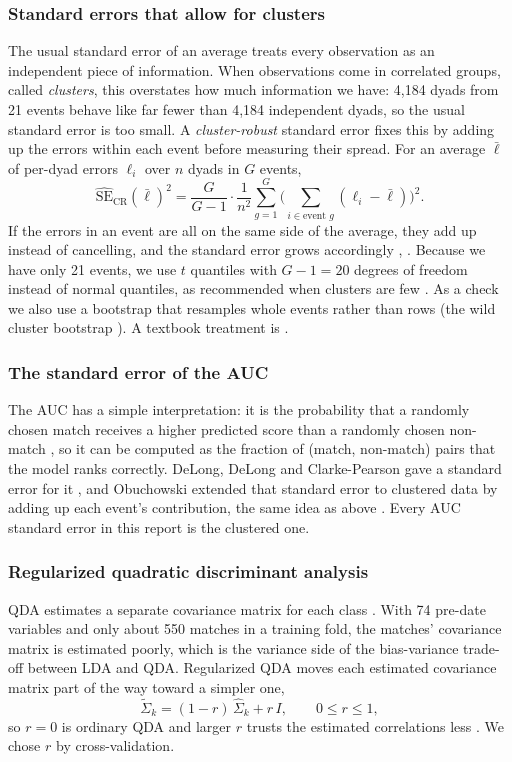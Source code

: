 \documentclass[11pt,letterpaper,reqno]{amsart}
\numberwithin{equation}{subsection}
\theoremstyle{definition}
\numberwithin{thm}{subsection}
\begin{document}
\subsubsection{Standard errors that allow for clusters}
The usual standard error of an average treats every observation as an independent piece of information. When
observations come in correlated groups, called \emph{clusters}, this overstates how much information we have: 4,184
dyads from 21 events behave like far fewer than 4,184 independent dyads, so the usual standard error is too small.
A \emph{cluster-robust} standard error fixes this by adding up the errors within each event before measuring their
spread. For an average $\bar\ell$ of per-dyad errors $\ell_i$ over $n$ dyads in $G$ events,
\[
\widehat{\mathrm{SE}}_{\mathrm{CR}}(\bar\ell)^2=\frac{G}{G-1}\cdot\frac{1}{n^2}\sum_{g=1}^{G}\Big(\sum_{i\in\text{event }g}(\ell_i-\bar\ell)\Big)^2 .
\]
If the errors in an event are all on the same side of the average, they add up instead of cancelling, and the
standard error grows accordingly \cite{Liang:1986}, \cite[Section II.C]{Cameron:2015}. Because we have only 21 events, we
use $t$ quantiles with $G-1=20$ degrees of freedom instead of normal quantiles, as recommended when clusters are few
\cite[Section VI]{Cameron:2015}. As a check we also use a bootstrap that resamples whole events rather than rows (the
wild cluster bootstrap \cite{Cameron:2008}). A textbook treatment is \cite[Section 24.5, pp.~829--845]{Cameron:2005}.

\subsubsection{The standard error of the AUC}
The AUC \cite[pp.~153--155]{James:2023} has a simple interpretation: it is the probability that a randomly chosen match
receives a higher predicted score than a randomly chosen non-match \cite[pp.~30--31]{Hanley:1982}, so it can be computed as
the fraction of (match, non-match) pairs that the model ranks correctly. DeLong, DeLong and Clarke-Pearson gave a
standard error for it \cite{DeLong:1988}, and Obuchowski extended that standard error to clustered data by adding up each
event's contribution, the same idea as above \cite{Obuchowski:1997}. Every AUC standard error in this report is the
clustered one.

\subsubsection{Regularized quadratic discriminant analysis}
QDA estimates a separate covariance matrix for each class \cite[Section 4.4.3, p.~156]{James:2023}. With 74 pre-date
variables and only about 550 matches in a training fold, the matches' covariance matrix is estimated poorly, which is
the variance side of the bias-variance trade-off between LDA and QDA. Regularized QDA \cite{Friedman:1989} moves each
estimated covariance matrix part of the way toward a simpler one,
\[
\widetilde\Sigma_k=(1-r)\,\hat\Sigma_k+r\,I,\qquad 0\le r\le 1,
\]
so $r=0$ is ordinary QDA and larger $r$ trusts the estimated correlations less \cite[Section 4.3.1, Eq.~(4.14), p.~112]{Hastie:2009}.
We chose $r$ by cross-validation.
\end{document}

